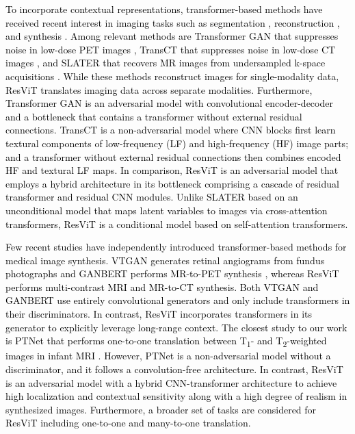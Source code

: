 \documentclass[journal,twoside,web]{ieeecolor}
\newcommand{\Tone}{T\textsubscript{1}}
\newcommand{\Ttwo}{T\textsubscript{2}}
\newcommand*{\revhl}{\textcolor{black}}
\begin{document}
\revhl{To incorporate contextual representations, transformer-based methods have received recent interest in imaging tasks such as segmentation \cite{trans_unet,xie2021,karimi2021}, reconstruction \cite{TransGAN,TransCT,SLATER}, and synthesis \cite{kamran2021,ganbert,ptnet}. Among relevant methods are Transformer GAN that suppresses noise in low-dose PET images \cite{TransGAN}, TransCT that suppresses noise in low-dose CT images \cite{TransCT}, and SLATER that recovers MR images from undersampled k-space acquisitions \cite{SLATER}. While these methods reconstruct images for single-modality data, ResViT translates imaging data across separate modalities. Furthermore, Transformer GAN is an adversarial model with convolutional encoder-decoder and a bottleneck that contains a transformer without external residual connections. TransCT is a non-adversarial model where CNN blocks first learn textural components of low-frequency (LF) and high-frequency (HF) image parts; and a transformer without external residual connections then combines encoded HF and textural LF maps. In comparison, ResViT is an adversarial model that employs a hybrid architecture in its bottleneck comprising a cascade of residual transformer and residual CNN modules. Unlike SLATER based on an unconditional model that maps latent variables to images via cross-attention transformers, ResViT is a conditional model based on self-attention transformers.} 

\revhl{Few recent studies have independently introduced transformer-based methods for medical image synthesis. VTGAN generates retinal angiograms from fundus photographs \cite{kamran2021} and GANBERT performs MR-to-PET synthesis \cite{ganbert}, whereas ResViT performs multi-contrast MRI and MR-to-CT synthesis. Both VTGAN and GANBERT use entirely convolutional generators and only include transformers in their discriminators. In contrast, ResViT incorporates transformers in its generator to explicitly leverage long-range context. The closest study to our work is PTNet that performs one-to-one translation between \Tone- and \Ttwo-weighted images in infant MRI \cite{ptnet}. However, PTNet is a non-adversarial model without a discriminator, and it follows a convolution-free architecture. In contrast, ResViT is an adversarial model with a hybrid CNN-transformer architecture to achieve high localization and contextual sensitivity along with a high degree of realism in synthesized images. Furthermore, a broader set of tasks are considered for ResViT including one-to-one and many-to-one translation.}
\end{document}
